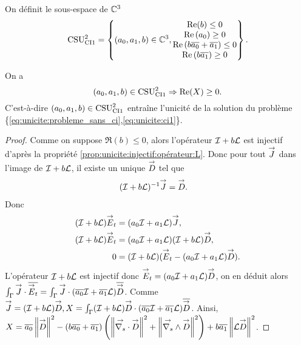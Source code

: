     \begin{defn}
      \label{def:csu:ci1-2}

      On définit le sous-espace de \(\CC^3\)
      \begin{equation*}
        \CSU[2]{CI1} = \left\lbrace
        (a_0,a_1,b) \in \CC^3,
        \begin{matrix}
        \Re(b) \le 0
        \\
        \Re\left(a_0\right) \ge 0
        \\
        \Re\left(b\conj{a_0}+\conj{a_1}\right) \le 0
        \\
        \Re\left(b\conj{a_1}\right) \ge 0
        \end{matrix}
        \right\rbrace.
      \end{equation*}
    \end{defn}

    \begin{prop}
      \label{prop:csu:ci1-2}
      On a 
      \begin{equation*}
        (a_0,a_1,b) \in \CSU[2]{CI1} \Rightarrow \Re(X)\ge 0. 
      \end{equation*}
      C'est-à-dire \((a_0,a_1,b) \in \CSU[2]{CI1}\) entraîne l'unicité de la solution du problème \{\eqref{eq:unicite:probleme_sans_ci},\eqref{eq:unicite:ci1}\}.
    \end{prop}

    \begin{proof}
      Comme on suppose \(\Re(b)\le 0\), alors l'opérateur \(\oI + b\LL\) est injectif d'après la propriété \ref{prop:unicite:injectif:opérateur:L}. Donc pour tout \(\vJ\) dans l'image de \(\oI + b\LL\), il existe un unique \(\vect{D}\) tel que
      \begin{align*}
        (\oI + b \LL)^{-1}\vJ &= \vect{D}.
      \end{align*}
      Donc 
      \begin{align*}
        (\oI + b \LL)\vE_t &= (a_0\oI + a_1\LL)\vJ,
        \\
        (\oI + b \LL)\vE_t &= (a_0\oI + a_1\LL)(\oI + b \LL)\vect{D},
        \\
        0 &= (\oI + b \LL)(\vE_t -  (a_0\oI + a_1\LL)\vect{D}).
      \end{align*}
      L'opérateur \(\oI + b \LL\) est injectif donc \(\vE_t = (a_0\oI + a_1\LL)\vect{D}\), on en déduit alors \(\int_\Gamma \vJ \cdot \conj{\vE_t} = \int_\Gamma \vJ \cdot (\conj{a_0}\oI + \conj{a_1}\LL)\conj{\vect{D}}\).
      Comme \(\vJ = (\oI + b \LL)\vect{D}, X = \int_\Gamma (\oI + b \LL)\vect{D} \cdot (\conj{a_0}\oI + \conj{a_1}\LL)\conj{\vect{D}}\).
      Ainsi, \( X = \conj{a_0}\norm{\vect{D}}^2 - (b\conj{a_0}+\conj{a_1})\left(\norm{\vdivs{\vect{D}}}^2+\norm{\vrots{\vect{D}}}^2\right) + b\conj{a_1} \norm{\LL\vect{D}}^2\).
    \end{proof}


